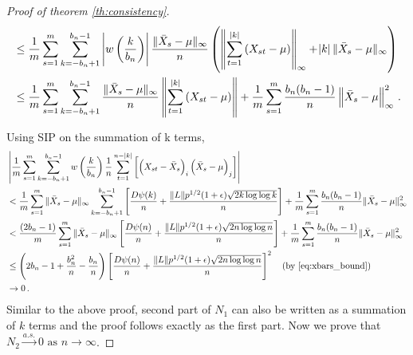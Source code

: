 \documentclass[11pt]{article}
\theoremstyle{remark}
\begin{document}
\begin{proof}[Proof of theorem \ref{th:consistency}]
\begin{align*}
    & \leq \dfrac{1}{m}\sum_{s=1}^{m}\sum_{k=-b_n+1}^{b_n-1} \left|w\left(\dfrac{k}{b_n}\right) \right|\dfrac{\|\bar{X}_s - \mu\|_{\infty}}{n} \left(\left\|\sum_{t=1}^{|k|}  \left(X_{st} - \mu \right)\right\|_{\infty} + \abs{k}\|\bar{X}_s - \mu\|_{\infty} \right)\\
    & \leq \dfrac{1}{m}\sum_{s=1}^{m}\sum_{k=-b_n+1}^{b_n-1}\dfrac{\|\bar{X}_s - \mu\|_{\infty}}{n} \left\|\sum_{t=1}^{|k|} \left(X_{st} - \mu\right) \right\| + \dfrac{1}{m}\sum\limits_{s=1}^{m} \dfrac{b_n(b_n-1)}{n} \left \|\bar{X}_s - \mu \right \|_{\infty}^2\,.
\end{align*}

Using SIP on the summation of k terms,
\begin{align*}
    & \left|\dfrac{1}{m}\sum_{s=1}^{m}\sum_{k=-b_n+1}^{b_n-1}w\left(\dfrac{k}{b_n}\right)\dfrac{1}{n}\sum_{t=1}^{n-|k|}\left[ \left(X_{st} - \bar{X}_s \right)_i  \left(\bar{X}_s - \mu \right)_j \right] \right|\\
   &  < \dfrac{1}{m}\sum\limits_{s=1}^{m}\|\bar{X}_s - \mu\|_{\infty}\sum\limits_{k=-b_n + 1}^{b_n-1}\left[ \dfrac{D \psi(k)}{n} + \dfrac{\|L\| p^{1/2}(1+\epsilon)\sqrt{2k \log\log k}}{n}  \right] + \dfrac{1}{m}\sum\limits_{s=1}^{m} \dfrac{b_n(b_n-1)}{n}\|\bar{X}_s - \mu\|_{\infty}^2\\
   &  < \dfrac{(2b_n-1)}{m}\sum\limits_{s=1}^{m}\|\bar{X}_s - \mu\|_{\infty}\left[ \dfrac{D \psi(n)}{n} + \dfrac{\|L\| p^{1/2}(1+\epsilon)\sqrt{2n \log\log n}}{n}  \right] + \dfrac{1}{m}\sum\limits_{s=1}^{m} \dfrac{b_n(b_n-1)}{n}\|\bar{X}_s - \mu\|_{\infty}^2 \\
   &  \leq   \left(2b_n - 1 + \dfrac{b_n^2}{n} - \dfrac{b_n}{n}\right)\left[ \dfrac{D \psi(n)}{n} + \dfrac{\|L\| p^{1/2}(1+\epsilon)\sqrt{2n \log\log n}}{n}  \right]^2 \quad \text{(by \eqref{eq:xbars_bound})} \\
   & \to 0\,.
\end{align*}
%
% 
%
%
Similar to the above proof, second part of $N_1$ can also be written as a summation of $k$ terms and the proof follows exactly as the first part. Now we prove that $N_2 \xrightarrow{a.s.} 0 \textrm{ as } n \to \infty$. 

\end{proof}
\end{document}

